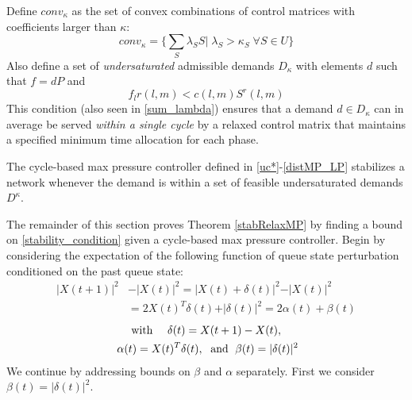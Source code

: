 Define $conv_{\kappa}$ as the set of convex combinations of control matrices with coefficients larger than $\kappa$:
\begin{equation}
conv_{\kappa} = \Big\{ \sum_{S}\lambda_{S}S \big| \; \lambda_S > \kappa_S \; \forall S\in U\Big\}
\end{equation}
Also define a set of \emph{undersaturated} admissible demands $D_{\kappa}$ with elements $d$ such that $f=dP$ and 
\begin{equation}\label{admissible_relaxed}
 f_{l}r(l,m) < c(l,m)S^r(l,m) 
 \end{equation} 
This condition (also seen in \eqref{sum_lambda}) ensures that a demand $d\in D_{\kappa}$ can in average be served \emph{within a single cycle} by a relaxed control matrix that maintains a specified minimum time allocation for each phase. 
\begin{Thm}\label{stabRelaxMP}
The cycle-based max pressure controller defined in \eqref{uc*}-\eqref{distMP_LP} 
stabilizes a network whenever the demand is within a set of feasible undersaturated demands $D^{\kappa}$.
\end{Thm}
The remainder of this section proves Theorem \ref{stabRelaxMP} by finding a bound on \eqref{stability_condition} given a cycle-based max pressure controller. Begin by considering the expectation of the following function of queue state perturbation conditioned on the past queue state:
\begin{align}
\vert X(t+1) \vert^2 & - \vert X(t)\vert^2 = \vert X(t) + \delta (t) \vert^2 - \vert X(t)\vert^2 \\
\nonumber &= 2X(t)^{T}\delta(t) + \vert \delta(t)  \vert^2 = 2\alpha(t) + \beta(t) 
\end{align}
\begin{gather}  \label{delta_def} 
\text{with \quad } \delta(t) = X(t+1) - X(t), \\ \;
\alpha(t)  = X(t)^{T}\delta(t),\; \text{ and } \;\beta(t) = \vert \delta (t) \vert^{2}\label{alpha_beta_defs}
\end{gather}
We continue by addressing bounds on $\beta$ and $\alpha$ separately. First we consider $\beta(t) = \vert \delta (t)\vert^{2}$.

